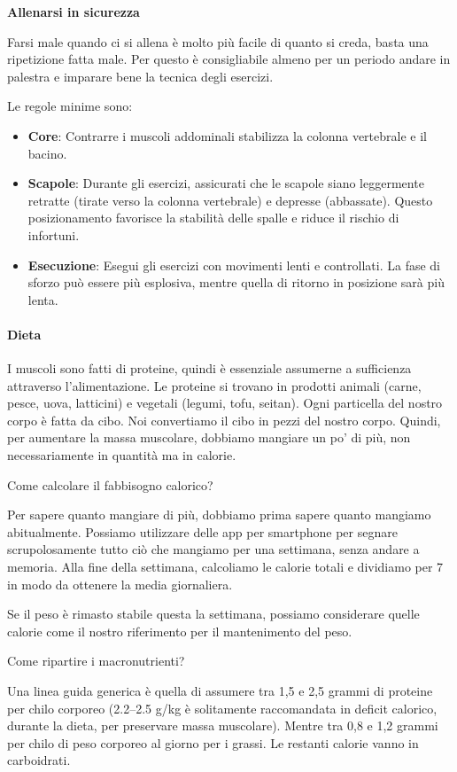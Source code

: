 \documentclass[12pt]{book} %
\begin{document}
\textbf{Allenarsi in sicurezza}

Farsi male quando ci si allena è molto più facile di quanto si creda, basta una ripetizione fatta male. Per questo è consigliabile almeno per un periodo andare in palestra e imparare bene la tecnica degli esercizi.

Le regole minime sono:
\begin{itemize}
\item \textbf{Core}: Contrarre i muscoli addominali stabilizza la colonna vertebrale e il bacino.
\item \textbf{Scapole}: Durante gli esercizi, assicurati che le scapole siano leggermente retratte (tirate verso la colonna vertebrale) e depresse (abbassate). Questo posizionamento favorisce la stabilità delle spalle e riduce il rischio di infortuni.
\item \textbf{Esecuzione}: Esegui gli esercizi con movimenti lenti e controllati. La fase di sforzo può essere più esplosiva, mentre quella di ritorno in posizione sarà più lenta.
\end{itemize}

\paragraph{Dieta}
I muscoli sono fatti di proteine, quindi è essenziale assumerne a sufficienza attraverso l'alimentazione. Le proteine si trovano in prodotti animali (carne, pesce, uova, latticini) e vegetali (legumi, tofu, seitan).
Ogni particella del nostro corpo è fatta da cibo. Noi convertiamo il cibo in pezzi del nostro corpo. Quindi, per aumentare la massa muscolare, dobbiamo mangiare un po' di più, non necessariamente in quantità ma in calorie.

Come calcolare il fabbisogno calorico?

Per sapere quanto mangiare di più, dobbiamo prima sapere quanto mangiamo abitualmente. Possiamo utilizzare delle app per smartphone per segnare scrupolosamente tutto ciò che mangiamo per una settimana, senza andare a memoria. Alla fine della settimana, calcoliamo le calorie totali e dividiamo per 7 in modo da ottenere la media giornaliera.

Se il peso è rimasto stabile questa la settimana, possiamo considerare quelle calorie come il nostro riferimento per il mantenimento del peso.

Come ripartire i macronutrienti?

Una linea guida generica è quella di assumere tra 1,5 e 2,5 grammi di proteine per chilo corporeo (2.2–2.5 g/kg è solitamente raccomandata in deficit calorico, durante la dieta, per preservare massa muscolare). Mentre tra 0,8 e 1,2 grammi per chilo di peso corporeo al giorno per i grassi. Le restanti calorie vanno in carboidrati.
\end{document}
